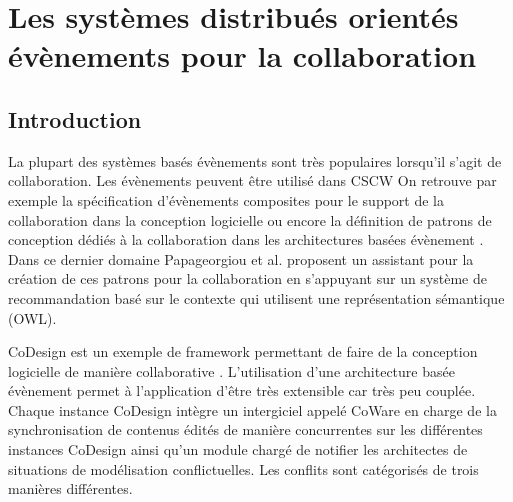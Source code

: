 
\section{Les systèmes distribués orientés évènements pour la collaboration}

	\subsection{Introduction}
La plupart des systèmes basés évènements sont très populaires lorsqu'il s'agit de 
collaboration\cite{Helmer2011}. Les évènements peuvent être utilisé dans 
\gls{CSCW}
On retrouve par exemple la spécification 
d'évènements composites 
pour le support de la collaboration dans la conception logicielle \cite{Yuan2002} 
ou encore la définition de patrons de conception dédiés à la collaboration dans les 
architectures basées évènement \cite{Verginadis2009}. Dans ce dernier domaine 
Papageorgiou et al. \cite{Papageorgiou2011} proposent un assistant pour la 
création de ces patrons pour la collaboration en s'appuyant sur un système de 
recommandation basé sur le contexte qui utilisent une représentation sémantique 
(\gls{OWL}).

CoDesign est un exemple de \gls{framework} permettant de faire de la 
conception logicielle de manière collaborative \cite{Bang2010}. L'utilisation d'une 
architecture basée évènement permet à l'application d'être très extensible car très 
peu couplée. Chaque instance CoDesign intègre un intergiciel appelé CoWare en 
charge de la synchronisation de contenus édités de manière concurrentes sur les 
différentes instances CoDesign ainsi qu'un module chargé de notifier les 
architectes de situations de modélisation conflictuelles. Les conflits sont 
catégorisés de trois manières différentes. 

